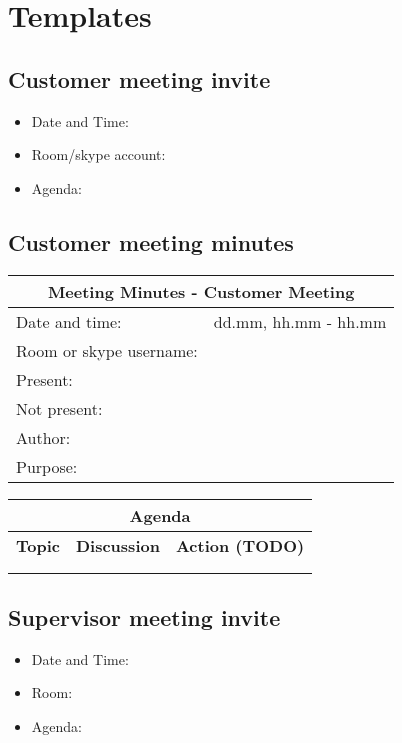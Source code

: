 \chapter{Templates}

\section{Customer meeting invite}

\begin{itemize}
	\item Date and Time:
	\item Room/skype account:
	\item Agenda:
\end{itemize}

\section{Customer meeting minutes}

\begin{tabular}{| p{3cm} | p{9cm} |}
	\hline
	\multicolumn{2}{|c|}{\Large \bf Meeting Minutes - Customer Meeting} \\ \hline
	Date and time: & dd.mm,  hh.mm - hh.mm \\ \hline
	Room or skype username: &  \\ \hline
	Present: &  \\ \hline
	Not present: &  \\ \hline
	Author: &  \\ \hline
	Purpose: &  \\ \hline
\end{tabular}

\begin{tabular}{| p{} | p{} | p{} |}
	\hline
	\multicolumn{3}{|c|}{\Large \bf Agenda} \\ \hline
	{\bf Topic} & {\bf Discussion} & {\bf Action (TODO)} \\ \hline
	& & \\ \hline
	& & \\ \hline
\end{tabular}

\section{Supervisor meeting invite}

\begin{itemize}
	\item Date and Time:
	\item Room:
	\item Agenda:
\end{itemize}

